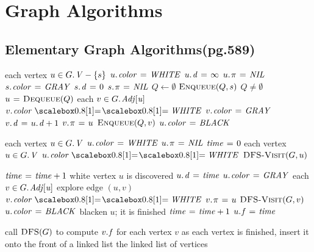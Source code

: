 \documentclass[twocolumn]{article}
\begin{document}
\section{Graph Algorithms}
\label{graph}
\subsection{Elementary Graph Algorithms(pg.589)}
\begin{codebox}
\li \For each vertex $u \in \attrib{G}{V} - \{ s\}$
\li \Do $\attrib{u}{color} \gets \id{WHITE}$
\li 		$\attrib{u}{d} \gets \infty$
\li 		$\attrib{u}{\pi} \gets \id{NIL}$
	\End
\li $\attrib{s}{color} \gets \id{GRAY}$
\li $\attrib{s}{d} \gets 0$
\li $\attrib{s}{\pi} \gets \id{NIL}$
\li $Q \gets \emptyset$
\li $\textnormal{\scshape Enqueue}(Q,s)$
\li \While $Q \neq \emptyset$
\li 		\Do $u \mathrel{\hspace{1pt}=\hspace{1pt}} \textnormal{\scshape Dequeue}(Q)$
\li 		\For each $v \in \attrib{G}{Adj[u]}$
\li 			\Do \If $\attrib{v}{color} \isequal \id{WHITE}$
\li 				\Then $\attrib{v}{color} \gets \id{GRAY}$
\li 					  $\attrib{v}{d} \gets \attrib{u}{d} + 1$
\li 					  $\attrib{v}{\pi} \gets u$
\li 					  $\textnormal{\scshape Enqueue}(Q,v)$
				\End
		\End
\li 		$\attrib{u}{color} \gets \id{BLACK}$
	\End
\end{codebox}

\begin{codebox}
\li \For each vertex $u \in \attrib{G}{V}$
\li 	\Do $\attrib{u}{color} \gets \id{WHITE}$
\li 		$\attrib{u}{\pi} \gets \id{NIL}$
	\End
\li $\id{time} \gets 0$
\li \For each vertex $u \in \attrib{G}{V}$
\li \Do \If $\attrib{u}{color} \isequal \id{WHITE}$
\li 		\Then $\textnormal{\scshape DFS-Visit}(G,u)$
		\End
	\End
\end{codebox}

\begin{codebox}
\li $\id{time} \gets \id{time} + 1$ \>\>\>\> \Comment white vertex $u$ is discovered
\li $\attrib{u}{d} \gets \id{time}$
\li $\attrib{u}{color} \gets \id{GRAY}$
\li \For each $v \in \attrib{G}{Adj[u]}$ \>\>\>\>\> \Comment explore edge $(u,v)$
\li \Do \If $\attrib{v}{color} \isequal \id{WHITE}$
\li 		\Then $\attrib{v}{\pi} \gets u$
\li 		$\textnormal{\scshape DFS-Visit}(G,v)$
		\End
	\End
\li $\attrib{u}{color} \gets \id{BLACK}$ \>\>\>\>\> \Comment blacken $u$; it is finished
\li $\id{time} \gets \id{time} + 1$
\li $\attrib{u}{f} \gets \id{time}$
\end{codebox}

\begin{codebox}
\li call $\textnormal{\scshape DFS}(G)$ to compute $\attrib{v}{f}$ for each vertex $v$
\li as each vertex is finished, insert it onto the front 
\zi of a linked list
\li \Return the linked list of vertices
\end{codebox}
\end{document}
